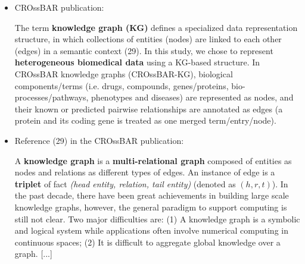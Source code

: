 \documentclass{article}
\begin{document}
\begin{itemize}
\item CROssBAR publication:
\begin{displayquote}
The term \textbf{knowledge graph (KG)} defines a specialized data representation structure, in which collections of entities (nodes) are linked to each other (edges) in a semantic context (29). In this study, we chose to represent \textbf{heterogeneous biomedical data} using a KG-based structure. In CROssBAR knowledge graphs (CROssBAR-KG), biological components/terms (i.e. drugs, compounds, genes/proteins, bio-processes/pathways, phenotypes and diseases) are represented as nodes, and their known or predicted pairwise relationships are annotated as edges (a protein and its coding gene is treated as one merged term/entry/node).
\end{displayquote}


\item Reference (29) in the CROssBAR publication:
\begin{displayquote}
A \textbf{knowledge graph} is a \textbf{multi-relational graph} composed of entities as nodes and relations as different types of edges. An instance of edge is a \textbf{triplet} of fact \textit{(head entity, relation, tail entity)} (denoted as $ (h, r, t) $). In the past decade, there have been great achievements in building large scale knowledge graphs, however, the general paradigm to support computing is still not clear. Two major difficulties are: (1) A knowledge graph is a symbolic and logical system while applications often involve numerical computing in continuous spaces; (2) It is difficult to aggregate global knowledge over a graph. [...]


\end{displayquote}
\end{itemize}
\end{document}
